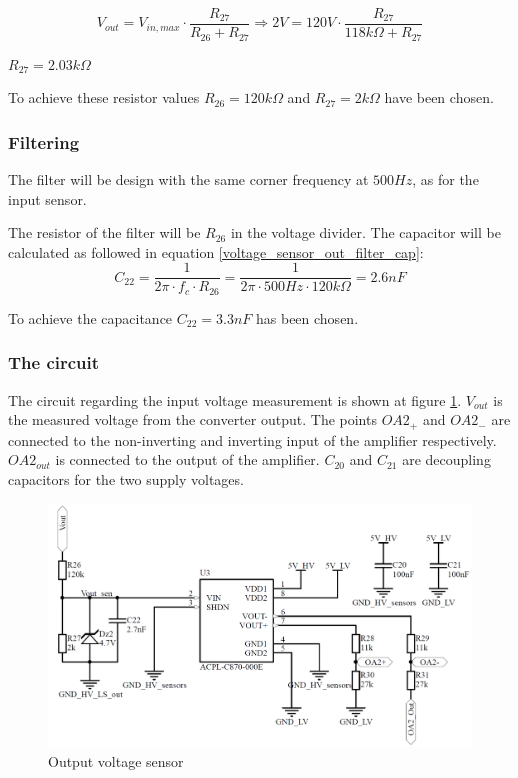 \begin{equation} 
	V_{out} = V_{in,max} \cdot \frac{R_{27}}{R_{26}+R_{27}} \Rightarrow 2V = 120V \cdot \frac{R_{27}}{118k\Omega+R_{27}}
\end{equation}
\begin{center}
	$R_{27} = 2.03k\Omega$
\end{center}

To achieve these resistor values $R_{26} = 120k\Omega$ and $R_{27} = 2k\Omega$ have been chosen. 

\subsubsection{Filtering}
The filter will be design with the same corner frequency at $500Hz$, as for the input sensor.

The resistor of the filter will be $R_{26}$ in the voltage divider. The capacitor will be calculated as followed in equation \ref{voltage_sensor_out_filter_cap}:
\begin{equation} \label{voltage_sensor_out_filter_cap}
	C_{22} = \frac{1}{2\pi \cdot f_c \cdot R_{26}} = \frac{1}{2 \pi \cdot 500Hz \cdot 120k\Omega} = 2.6nF
\end{equation}

To achieve the capacitance $C_{22} = 3.3nF$ has been chosen. 

\subsubsection{The circuit}
The circuit regarding the input voltage measurement is shown at figure \ref{fig:output_voltage_sensor_circuit}. $V_{out}$ is the measured voltage from the converter output. The points $OA2_+$ and $OA2_-$ are connected to the non-inverting and inverting input of the amplifier respectively. $OA2_{out}$ is connected to the output of the amplifier. $C_{20}$ and $C_{21}$ are decoupling capacitors for the two supply voltages. 

\begin{figure}[htbp]
	\begin{center}
		\includegraphics[width=0.7\linewidth]{../Pictures/P1/Sensors/output_voltage_sensor.PNG}
		\caption{Output voltage sensor}
		\label{fig:output_voltage_sensor_circuit}
	\end{center}
\end{figure}